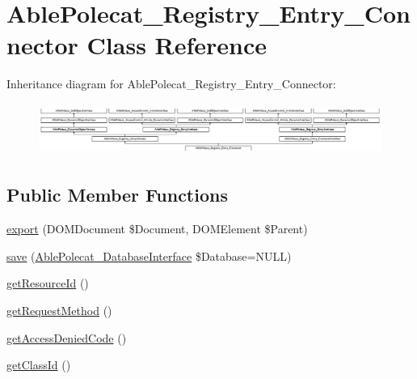 \hypertarget{class_able_polecat___registry___entry___connector}{}\section{Able\+Polecat\+\_\+\+Registry\+\_\+\+Entry\+\_\+\+Connector Class Reference}
\label{class_able_polecat___registry___entry___connector}
Inheritance diagram for Able\+Polecat\+\_\+\+Registry\+\_\+\+Entry\+\_\+\+Connector\+:\begin{figure}[H]
\begin{center}
\leavevmode
\includegraphics[height=1.707317cm]{class_able_polecat___registry___entry___connector}
\end{center}
\end{figure}
\subsection*{Public Member Functions}
\begin{DoxyCompactItemize}
\item 
\hyperlink{class_able_polecat___registry___entry___connector_a0a05b2e4b3a44390eeb042064e427b1a}{export} (D\+O\+M\+Document \$Document, D\+O\+M\+Element \$Parent)
\item 
\hyperlink{class_able_polecat___registry___entry___connector_a999eef977eb899167ae02f83dd26a4ae}{save} (\hyperlink{interface_able_polecat___database_interface}{Able\+Polecat\+\_\+\+Database\+Interface} \$Database=N\+U\+L\+L)
\item 
\hyperlink{class_able_polecat___registry___entry___connector_a0ac412173b2b1d569ef90a1ac095ca5d}{get\+Resource\+Id} ()
\item 
\hyperlink{class_able_polecat___registry___entry___connector_ae534469d94a650b89ceb36b968bd3727}{get\+Request\+Method} ()
\item 
\hyperlink{class_able_polecat___registry___entry___connector_a62bff70fdf72bd7a3e5bd844978d4322}{get\+Access\+Denied\+Code} ()
\item 
\hyperlink{class_able_polecat___registry___entry___connector_acc9039051a8b6d4fe7c5ddfbaedbcbcb}{get\+Class\+Id} ()
\end{DoxyCompactItemize}
